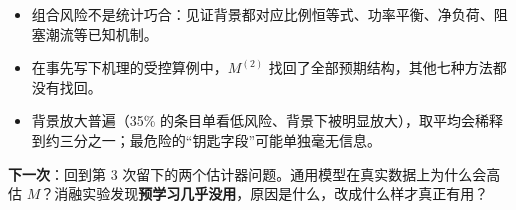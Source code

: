\documentclass[zihao=-4,a4paper]{ctexart}
\begin{document}
\begin{keybox}[小结]
\begin{itemize}[leftmargin=*]
  \item 组合风险不是统计巧合：见证背景都对应比例恒等式、功率平衡、净负荷、阻塞潮流等已知机制。
  \item 在事先写下机理的受控算例中，$M^{(2)}$ 找回了全部预期结构，其他七种方法都没有找回。
  \item 背景放大普遍（35\% 的条目单看低风险、背景下被明显放大），取平均会稀释到约三分之一；最危险的“钥匙字段”可能单独毫无信息。
\end{itemize}
\end{keybox}

\textbf{下一次}：回到第 3 次留下的两个估计器问题。通用模型在真实数据上为什么会高估 $M$？消融实验发现\textbf{预学习几乎没用}，原因是什么，改成什么样才真正有用？
\end{document}
